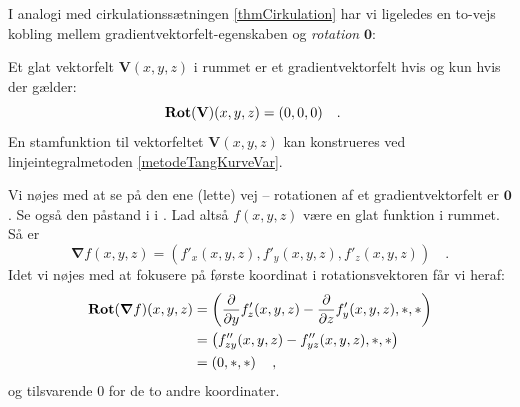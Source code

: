  I analogi med cirkulationssætningen \ref{thmCirkulation} har vi ligeledes en to-vejs kobling mellem gradientvektorfelt-egenskaben  og \emph{rotation} $\mathbf{0}$:

\begin{theorem}\label{thmStamfunk}
Et glat vektorfelt $\mathbf{V}(x,y,z)$ i rummet er et gradientvektorfelt hvis og kun hvis der gælder:
\begin{equation}
\operatorname{\bf{Rot}}(\mathbf{V})(x,y,z) = (0,0,0) \quad . \quad
\end{equation}
En stamfunktion til vektorfeltet $\mathbf{V}(x,y,z)$  kan konstrueres ved linjeintegralmetoden \ref{metodeTangKurveVar}.
\end{theorem}
\begin{bevis}
Vi nøjes med at se på den ene (lette) vej -- rotationen af et gradientvektorfelt er $\mathbf{0}$.  Se også den påstand i
  i .
Lad altså $f(x,y,z)$ være en glat funktion i rummet. Så er
\begin{equation}
\bm{\nabla}f(x,y,z) = \left(f'_{x}(x,y,z), f'_{y}(x,y,z), f'_{z}(x,y,z) \right) \quad .
\end{equation}
Idet vi nøjes med at fokusere på første koordinat i  rotationsvektoren får vi heraf:
\begin{equation}
\begin{aligned}
\operatorname{\bf{Rot}}(\bm{\nabla}f)(x,y,z) &=
\left(\frac{\partial}{\partial y}f'_{z}(x,y,z) - \frac{\partial}{\partial z}f'_{y}(x,y,z), * , * \right) \\
&= \left(f''_{zy}(x,y,z) - f''_{yz}(x,y,z), * , *\right) \\
&= \left(0, *, * \right) \quad ,
\end{aligned}
\end{equation}
og tilsvarende $0$ for de to andre koordinater.
\end{bevis}



